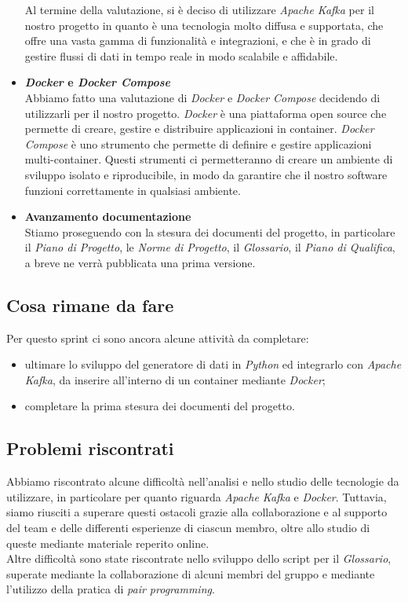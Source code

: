 \documentclass[italian,12pt]{article}
\begin{document}
\begin{itemize}
	Al termine della valutazione, si è deciso di utilizzare \textit{Apache Kafka} per il nostro progetto in quanto è una tecnologia molto diffusa e supportata, che offre una vasta gamma di funzionalità e integrazioni, e che è in grado di gestire flussi di dati in tempo reale in modo scalabile e affidabile.
	\item \textbf{\textit{Docker} e \textit{Docker Compose}} \\
	Abbiamo fatto una valutazione di \textit{Docker} e \textit{Docker Compose} decidendo di utilizzarli per il nostro progetto. \textit{Docker} è una piattaforma open source che permette di creare, gestire e distribuire applicazioni in container. \textit{Docker Compose} è uno strumento che permette di definire e gestire applicazioni multi-container. Questi strumenti ci permetteranno di creare un ambiente di sviluppo isolato e riproducibile, in modo da garantire che il nostro software funzioni correttamente in qualsiasi ambiente.
	\item \textbf{Avanzamento documentazione} \\
	Stiamo proseguendo con la stesura dei documenti del progetto, in particolare il \textit{Piano di Progetto}, le \textit{Norme di Progetto}, il \textit{Glossario}, il \textit{Piano di Qualifica}, a breve ne verrà pubblicata una prima versione.
\end{itemize}

\subsection{Cosa rimane da fare}
Per questo sprint ci sono ancora alcune attività da completare:
\begin{itemize}
	\item ultimare lo sviluppo del generatore di dati in \textit{Python} ed integrarlo con \textit{Apache Kafka}, da inserire all'interno di un container mediante \textit{Docker};
	\item completare la prima stesura dei documenti del progetto.
\end{itemize}

\subsection{Problemi riscontrati}
Abbiamo riscontrato alcune difficoltà nell'analisi e nello studio delle tecnologie da utilizzare, in particolare per quanto riguarda \textit{Apache Kafka} e \textit{Docker}. Tuttavia, siamo riusciti a superare questi ostacoli grazie alla collaborazione e al supporto del team e delle differenti esperienze di ciascun membro, oltre allo studio di queste mediante materiale reperito online. \\
Altre difficoltà sono state riscontrate nello sviluppo dello script per il \textit{Glossario}, superate mediante la collaborazione di alcuni membri del gruppo e mediante l'utilizzo della pratica di \textit{pair programming}.
\end{document}
